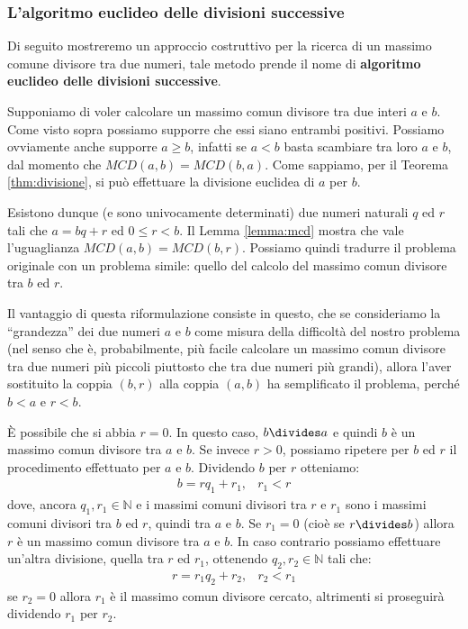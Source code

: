 \subsubsection{L'algoritmo euclideo delle divisioni successive}
Di seguito mostreremo un approccio costruttivo per la ricerca di un massimo comune divisore tra due numeri, tale metodo prende il nome di \textbf{algoritmo euclideo delle divisioni successive}. 

Supponiamo di voler calcolare un massimo comun divisore tra due interi $a$ e $b$. Come visto sopra possiamo supporre che essi siano entrambi positivi. Possiamo ovviamente anche supporre $a \geq b$, infatti se $a < b$ basta scambiare tra loro $a$ e $b$, dal momento che $MCD(a, b) = MCD(b, a)$. Come sappiamo, per il Teorema \ref{thm:divisione}, si può effettuare la divisione euclidea di $a$ per $b$. 

Esistono dunque (e sono univocamente determinati) due numeri naturali $q$ ed $r$ tali che $a=bq+r$ ed $0 \leq r < b$. Il Lemma \ref{lemma:mcd} mostra che vale l'uguaglianza $MCD(a,b)=MCD(b,r)$. Possiamo quindi tradurre il problema originale con un problema simile: quello del calcolo del massimo comun divisore tra $b$ ed $r$. 

Il vantaggio di questa riformulazione consiste in questo, che se consideriamo la ``grandezza'' dei due numeri $a$ e $b$ come misura della difficoltà del nostro problema (nel senso che è, probabilmente, più facile calcolare un massimo comun divisore tra due numeri più piccoli piuttosto che tra due numeri più grandi), allora l’aver sostituito la coppia $(b, r)$ alla coppia $(a, b)$ ha semplificato il problema, perché $b < a$ e $r < b$.

È possibile che si abbia $r=0$. In questo caso, $b \divides a$ e quindi $b$ è un massimo comun divisore tra $a$ e $b$. Se invece $r>0$, possiamo ripetere per $b$ ed $r$ il procedimento effettuato per $a$ e $b$. Dividendo $b$ per $r$ otteniamo:
\begin{align*}
		b= rq_{1}+r_{1}, &  r_{1} < r
\end{align*}
dove, ancora $q_{1},r_{1} \in \mathbb{N}$ e i massimi comuni divisori tra $r$ e $r_{1}$ sono i massimi comuni divisori tra $b$ ed $r$, quindi tra $a$ e $b$. Se $r_{1}=0$ (cioè se $r \divides b$) allora $r$ è un massimo comun divisore tra $a$ e $b$. In caso contrario possiamo effettuare un'altra divisione, quella tra $r$ ed $r_{1}$, ottenendo $q_{2}, r_{2} \in \mathbb{N}$ tali che:
\begin{align*}
		r=r_{1}q_{2}+r_{2}, & r_{2} < r_{1}
\end{align*}
se $r_{2}=0$ allora $r_{1}$ è il massimo comun divisore cercato, altrimenti si proseguirà dividendo $r_{1}$ per $r_{2}$.

